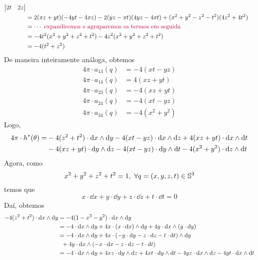 \begin{dem}
\begin{itemize}
\begin{align*}
\begin{vmatrix}
2t & 2z
\end{vmatrix} \\
&= 2(xz+yt)(-4yt - 4xz) - 2(yz - xt)(4yz - 4xt) + (x^2 + y^2 - z^2 - t^2)(4z^2 + 4t^2) \\ 
&= \cdots \purple{\text{ expandiremos e agruparemos os termos em seguida}} \\
&= -4t^2(x^2 + y^2 + z^2 + t^2) - 4z^2(x^2 + y^2 + z^2 + t^2) \\
&= -4(t^2 + z^2)
\end{align*}
De maneira inteiramente análoga, obtemos
\begin{align*}
4\pi \cdot a_{13}(q) &= -4(xt -  yz) \\
4\pi \cdot a_{14}(q) &= 4(xz + yt) \\
4\pi \cdot a_{23}(q) &= -4(xz + yt) \\
4\pi \cdot a_{24}(q) &= -4(xt - yz) \\
4\pi \cdot a_{34}(q) &= -4(x^2 + y^2)
\end{align*}
Logo,
\begin{equation}\label{theta}
\begin{aligned}
4\pi \cdot h^{*}(\theta) = &-4(z^2 + t^2) \cdot \dd x \wg \dd y - 4(xt - yz) \cdot \dd x \wg \dd z + 4(xz+yt) \cdot \dd x \wg \dd t \\
&-4(xz + yt) \cdot \dd y \wg \dd z - 4(xt - yz) \cdot \dd y \wg \dd t - 4(x^2 + y^2) \cdot \dd z \wg \dd t
\end{aligned}
\end{equation}
Agora, como
\[
x^2 + y^2 + z^2 + t^2 = 1, \ \forall q = (x, y, z, t) \in \S^3
\]
temos que
\[
x \cdot \dd x + y \cdot \dd y + z \cdot \dd z + t \cdot \dd t = 0
\]
Daí, obtemos
\begin{equation}\label{teste1}
\begin{aligned}
-4(z^2 + t^2)\cdot \dd x \wg \dd y &= -4(1-x^2 - y^2) \cdot  \dd x \wg \dd y  \\
&=-4 \cdot \dd x \wg \dd y + 4x \cdot (x \cdot \dd x) \wg \dd y + 4y \cdot \dd x \wg (y \cdot \dd y) \\
&= -4 \cdot \dd x \wg \dd y + 4x \cdot (-y \cdot \dd y - z \cdot \dd z - t \cdot \dd t ) \wg \dd y \\
&\hspace{0.2cm}+ 4y \cdot \dd x \wedge (-x \cdot \dd x - z \cdot \dd z - t \cdot \dd t) \\
&=-4 \cdot \dd x \wg \dd y + 4xz \cdot \dd y \wg \dd z + 4xt \cdot \dd y \wg \dd t - 4yz \cdot \dd x \wg \dd z - 4yt \cdot \dd x \wg \dd t
\end{aligned}

\end{equation}
\end{itemize}
\end{dem}
